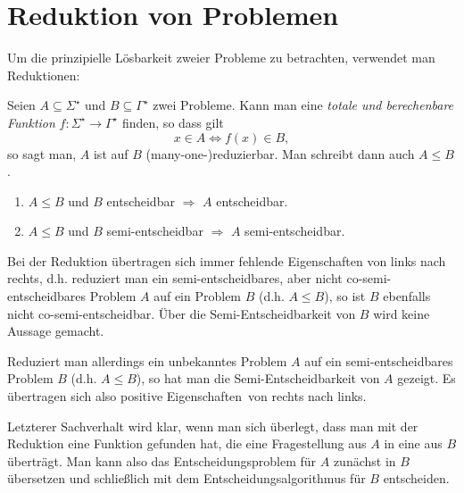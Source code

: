 \section{Reduktion von Problemen}\label{sec:reduktion}
Um die prinzipielle Lösbarkeit zweier Probleme zu betrachten, verwendet man Reduktionen:

Seien $A\subseteq \Sigma^\star$ und $B\subseteq \Gamma^\star$ zwei Probleme. Kann man eine \emph{totale und berechenbare Funktion} $f:\Sigma^\star\rightarrow\Gamma^\star$ finden, so dass gilt
\begin{equation*}
	x\in A\Leftrightarrow f(x)\in B,
\end{equation*}
so sagt man, $A$ ist auf $B$ (many-one-)reduzierbar.
Man schreibt dann auch $A\leq B$.

\begin{enumerate}
	\item $A\leq B$ und $B$ entscheidbar $\Rightarrow$ $A$ entscheidbar.
	\item $A\leq B$ und $B$ semi-entscheidbar $\Rightarrow$ $A$ semi-entscheidbar.
\end{enumerate}

Bei der Reduktion übertragen sich immer fehlende Eigenschaften von links nach rechts, d.h. reduziert man ein semi-entscheidbares, aber nicht co-semi-entscheidbares Problem $A$ auf ein Problem $B$ (d.h. $A\leq B$), so ist $B$ ebenfalls nicht co-semi-entscheidbar. Über die Semi-Entscheidbarkeit von $B$ wird keine Aussage gemacht.

Reduziert man allerdings ein unbekanntes Problem $A$ auf ein semi-entscheidbares Problem $B$ (d.h. $A\leq B$), so hat man die Semi-Entscheidbarkeit von $A$ gezeigt. Es übertragen sich also \glqq positive Eigenschaften\grqq\  von rechts nach links.

Letzterer Sachverhalt wird klar, wenn man sich überlegt, dass man mit der Reduktion eine Funktion gefunden hat, die eine Fragestellung aus $A$ in eine aus $B$ überträgt. Man kann also das Entscheidungsproblem für $A$ zunächst in $B$ übersetzen und schließlich mit dem Entscheidungsalgorithmus für $B$ entscheiden.

